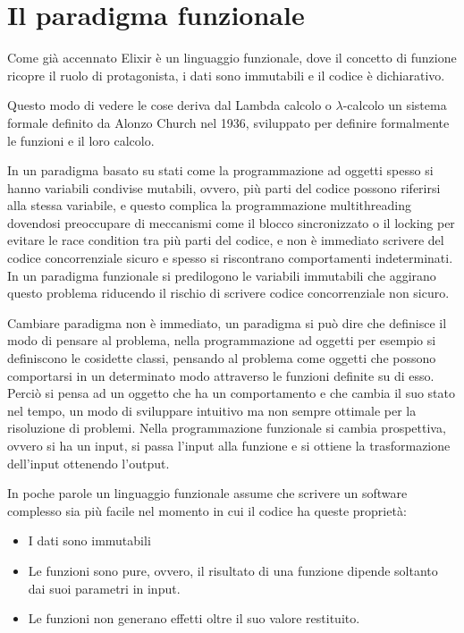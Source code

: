 \section{Il paradigma funzionale}
\renewcommand\lstlistingname{Esempio}
Come già accennato Elixir è un linguaggio funzionale, dove
il concetto di funzione ricopre il ruolo di protagonista,
i dati sono immutabili e il codice è dichiarativo.

Questo modo di vedere le cose deriva dal Lambda calcolo o $\lambda$-calcolo
\cite{Lambdaca75:online}
un sistema formale definito da Alonzo Church nel 1936, sviluppato
per definire formalmente le funzioni e il loro calcolo.

In un paradigma basato su stati come la programmazione ad oggetti
spesso si hanno variabili condivise mutabili, ovvero, più parti del codice
possono riferirsi alla stessa variabile, e questo complica la programmazione
multithreading dovendosi preoccupare di meccanismi come il blocco
sincronizzato o il locking per evitare le race condition tra più parti
del codice, e non è immediato scrivere del codice concorrenziale sicuro
e spesso si riscontrano comportamenti indeterminati.
In un paradigma funzionale si predilogono le variabili immutabili che
aggirano questo problema riducendo il rischio di scrivere codice
concorrenziale non sicuro.

Cambiare paradigma non è immediato, un paradigma si può dire che
definisce il modo di pensare al problema, nella programmazione ad
oggetti per esempio si definiscono le cosidette classi,
pensando al problema come oggetti che possono comportarsi in un
determinato modo attraverso le funzioni definite su di esso.
Perciò si pensa ad un oggetto che ha un comportamento e che cambia
il suo stato nel tempo, un modo di sviluppare intuitivo ma non sempre
ottimale per la risoluzione di problemi. Nella programmazione funzionale
si cambia prospettiva, ovvero si ha un input, si passa l'input 
alla funzione e si ottiene la trasformazione dell'input ottenendo
l'output.

In poche parole un linguaggio funzionale assume che scrivere un
software complesso sia più facile nel momento in cui il codice ha
queste proprietà:
\begin{itemize}
    \item I dati sono immutabili
    \item Le funzioni sono pure, ovvero, il risultato di una funzione
    dipende soltanto dai suoi parametri in input.
    \item Le funzioni non generano effetti oltre il suo valore restituito.
\end{itemize}

